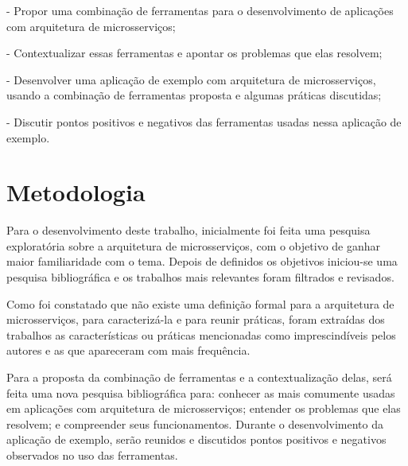 
- Propor uma combinação de ferramentas para o desenvolvimento de aplicações com arquitetura de microsserviços;

- Contextualizar essas ferramentas e apontar os problemas que elas resolvem;

- Desenvolver uma aplicação de exemplo com arquitetura de microsserviços, usando a combinação de ferramentas proposta e algumas práticas discutidas;

- Discutir pontos positivos e negativos das ferramentas usadas nessa aplicação de exemplo.

\section{Metodologia}

Para o desenvolvimento deste trabalho, inicialmente foi feita uma pesquisa exploratória sobre a arquitetura de microsserviços, com o objetivo de ganhar maior familiaridade com o tema. Depois de definidos os objetivos iniciou-se uma pesquisa bibliográfica e os trabalhos mais relevantes foram filtrados e revisados. 

Como foi constatado que não existe uma definição formal para a arquitetura de microsserviços, para caracterizá-la e para reunir práticas, foram extraídas dos trabalhos as características ou práticas mencionadas como imprescindíveis pelos autores e as que apareceram com mais frequência. 

Para a proposta da combinação de ferramentas e a contextualização delas, será feita uma nova pesquisa bibliográfica para: conhecer as mais comumente usadas em aplicações com arquitetura de microsserviços; entender os problemas que elas resolvem; e compreender seus funcionamentos. Durante o desenvolvimento da aplicação de exemplo, serão reunidos e discutidos pontos positivos e negativos observados no uso das ferramentas.  



